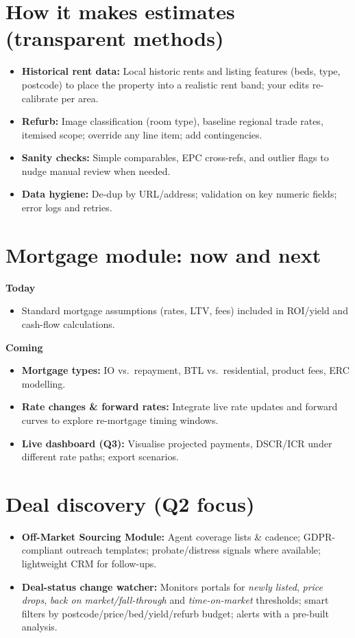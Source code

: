 \documentclass[11pt,a4paper]{article}
\begin{document}
\section*{How it makes estimates (transparent methods)}
\begin{itemize}
  \item \textbf{Historical rent data:} Local historic rents and listing features (beds, type, postcode) to place the property into a realistic rent band; your edits re-calibrate per area.
  \item \textbf{Refurb:} Image classification (room type), baseline regional trade rates, itemised scope; override any line item; add contingencies.
  \item \textbf{Sanity checks:} Simple comparables, EPC cross-refs, and outlier flags to nudge manual review when needed.
  \item \textbf{Data hygiene:} De-dup by URL/address; validation on key numeric fields; error logs and retries.
\end{itemize}

\section*{Mortgage module: now and next}
\textbf{Today}
\begin{itemize}
  \item Standard mortgage assumptions (rates, LTV, fees) included in ROI/yield and cash-flow calculations.
\end{itemize}
\textbf{Coming}
\begin{itemize}
  \item \textbf{Mortgage types:} IO vs.\ repayment, BTL vs.\ residential, product fees, ERC modelling.
  \item \textbf{Rate changes \& forward rates:} Integrate live rate updates and forward curves to explore re-mortgage timing windows.
  \item \textbf{Live dashboard (Q3):} Visualise projected payments, DSCR/ICR under different rate paths; export scenarios.
\end{itemize}

\section*{Deal discovery (Q2 focus)}
\begin{itemize}
  \item \textbf{Off-Market Sourcing Module:} Agent coverage lists \& cadence; GDPR-compliant outreach templates; probate/distress signals where available; lightweight CRM for follow-ups.
  \item \textbf{Deal-status change watcher:} Monitors portals for \emph{newly listed}, \emph{price drops}, \emph{back on market/fall-through} and \emph{time-on-market} thresholds; smart filters by postcode/price/bed/yield/refurb budget; alerts with a pre-built analysis.
\end{itemize}
\end{document}
